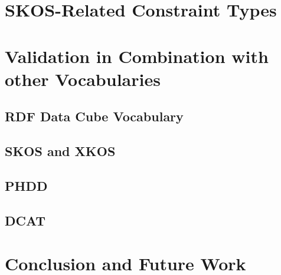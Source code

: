 \documentclass{llncs}
\begin{document}
\section{SKOS-Related Constraint Types}

\section{Validation in Combination with other Vocabularies}

\subsection{RDF Data Cube Vocabulary}

\subsection{SKOS and XKOS}

\subsection{PHDD}

\subsection{DCAT}

\section{Conclusion and Future Work}

{}

\setcounter{tocdepth}{1}
\end{document}

